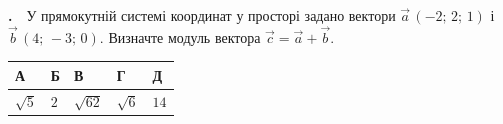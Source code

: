 \documentclass[12pt]{article}
\newlength{\nmtcellw}
\newcommand{\nmtSetCell}{\setlength{\nmtcellw}{\dimexpr(\linewidth-10\tabcolsep-6\arrayrulewidth)/5\relax}}
\newcommand{\answerTable}[5]{%
\par\nopagebreak\vspace{0.15cm}
\noindent\nmtSetCell
\begin{tabular}{|*{5}{>{\centering\arraybackslash}m{\nmtcellw}|}}
\hline
\rule[-0.15cm]{0pt}{0.6cm}\textbf{А} & \rule[-0.15cm]{0pt}{0.6cm}\textbf{Б} & \rule[-0.15cm]{0pt}{0.6cm}\textbf{В} & \rule[-0.15cm]{0pt}{0.6cm}\textbf{Г} & \rule[-0.15cm]{0pt}{0.6cm}\textbf{Д} \\
\hline
\rule[-0.2cm]{0pt}{0.75cm}#1 & \rule[-0.2cm]{0pt}{0.75cm}#2 & \rule[-0.2cm]{0pt}{0.75cm}#3 & \rule[-0.2cm]{0pt}{0.75cm}#4 & \rule[-0.2cm]{0pt}{0.75cm}#5 \\
\hline
\end{tabular}
\par\vspace{0.25cm}
}
\newcommand{\matchingGrid}{%
    \sbox{\nmtgridbox}{\matchingGridRaw}%
    \ifdim\wd\nmtgridbox>\linewidth \resizebox{\linewidth}{!}{\usebox{\nmtgridbox}}\else\usebox{\nmtgridbox}\fi}
\newcommand{\matchingGridRaw}{%
    \begingroup
    \renewcommand{\arraystretch}{1.15}
    \setlength{\tabcolsep}{4pt}
    \footnotesize
    \begin{tabular}{r|c|c|c|c|c|}
         \multicolumn{1}{c}{} & \multicolumn{1}{c}{\textbf{А}} & \multicolumn{1}{c}{\textbf{Б}} & \multicolumn{1}{c}{\textbf{В}} & \multicolumn{1}{c}{\textbf{Г}} & \multicolumn{1}{c}{\textbf{Д}} \\ \cline{2-6}
         \textbf{1} & \phantom{X} & \phantom{X} & \phantom{X} & \phantom{X} & \phantom{X} \\ \cline{2-6}
         \textbf{2} & & & & & \\ \cline{2-6}
         \textbf{3} & & & & & \\ \cline{2-6}
    \end{tabular}
    \endgroup
}
\newcounter{zad}
\newcommand{\zadtask}[1]{\stepcounter{zad}\noindent\textbf{\thezad.}\ \ #1\par\nopagebreak\vspace{0.2cm}}
\newcounter{ans}
\begin{document}
\providecommand{\trigStyle}[1]{#1}
\providecommand{\answerTableSmall}[5]{%
\begingroup\setlength{\tabcolsep}{2pt}\small\nmtSetCell
\begin{tabular}{|*{5}{>{\centering\arraybackslash}m{\nmtcellw}|}}
\hline
\rule[-0.2cm]{0pt}{0.6cm}\textbf{А} & \textbf{Б} & \textbf{В} & \textbf{Г} & \textbf{Д} \\
\hline
\rule[-0.4cm]{0pt}{0.9cm}#1 & \rule[-0.4cm]{0pt}{0.9cm}#2 & \rule[-0.4cm]{0pt}{0.9cm}#3 & \rule[-0.4cm]{0pt}{0.9cm}#4 & \rule[-0.4cm]{0pt}{0.9cm}#5 \\
\hline
\end{tabular}\endgroup}
\providecommand{\matchingLayout}[3]{%
    \noindent
    \begin{minipage}[t]{0.36\textwidth}\vspace{0pt}\raggedright
        #1
    \end{minipage}%
    \hfill
    \begin{minipage}[t]{0.43\textwidth}\vspace{0pt}\raggedright
        #2
    \end{minipage}%
    \hfill
    \begin{minipage}[t]{0.19\textwidth}
        \vspace{0pt}
        \begin{flushright}
        #3
        \end{flushright}
    \end{minipage}}
\providecommand{\matchingLayoutBottom}[2]{%
    \noindent
    \begin{minipage}[t]{0.48\textwidth}\vspace{0pt}\raggedright
        #1
    \end{minipage}%
    \hfill
    \begin{minipage}[t]{0.48\textwidth}\vspace{0pt}\raggedright
        #2
    \end{minipage}
    \vspace{0.5cm}
    \noindent
    \matchingGrid}
\providecommand{\answerListVertical}[5]{%
    \par\nopagebreak\vspace{0.2cm}
    \begin{itemize}[itemsep=0.4cm, leftmargin=1.5cm, labelsep=0.5cm]
        \item[\textbf{А}] #1
        \item[\textbf{Б}] #2
        \item[\textbf{В}] #3
        \item[\textbf{Г}] #4
        \item[\textbf{Д}] #5
    \end{itemize}
    \vspace{0.2cm}}
\begin{samepage}
\zadtask{У прямокутній системі координат у просторі задано вектори $\vec{a}\,(-2;\, 2;\, 1)$ і $\vec{b}\,(4;\, -3;\, 0)$. Визначте модуль вектора $\vec{c} = \vec{a} + \vec{b}$.}
\answerTable{$\sqrt{5}$}{$2$}{$\sqrt{62}$}{$\sqrt{6}$}{$14$}

\par{}
\end{samepage}
\endgroup
\end{document}
